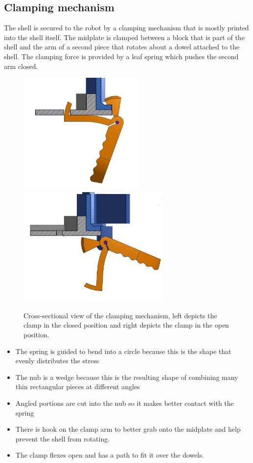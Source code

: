 \documentclass{iopart}
\begin{document}
\subsection{Clamping mechanism}
The shell is secured to the robot by a clamping mechanism that is mostly printed into the shell itself. The midplate is clamped between a block that is part of the shell and the arm of a second piece that rotates about a dowel attached to the shell. The clamping force is provided by a leaf spring which pushes the second arm closed.

\begin{figure}[h!]
    \centering
    \includegraphics[height=6cm]{graphics/clamp_cross-section.png}
    \includegraphics[height=6cm]{graphics/clamp_cross-section2.png}
    \caption{Cross-sectional view of the clamping mechanism, left depicts the clamp in the closed position and right depicts the clamp in the open position.}
\end{figure}

\begin{itemize}
    \item The spring is guided to bend into a circle because this is the shape that evenly distributes the stress
    \item The nub is a wedge because this is the resulting shape of combining many thin rectangular pieces at different angles
    \item Angled portions are cut into the nub so it makes better contact with the spring
    \item There is hook on the clamp arm to better grab onto the midplate and help prevent the shell from rotating.
    \item The clamp flexes open and has a path to fit it over the dowels.
\end{itemize}
\end{document}
